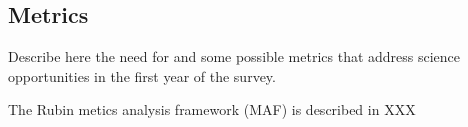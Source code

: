 \subsection{Metrics}

Describe here the need for and some possible  metrics that address science opportunities in the first year of the survey.

The Rubin metics analysis framework (MAF) is described in XXX
